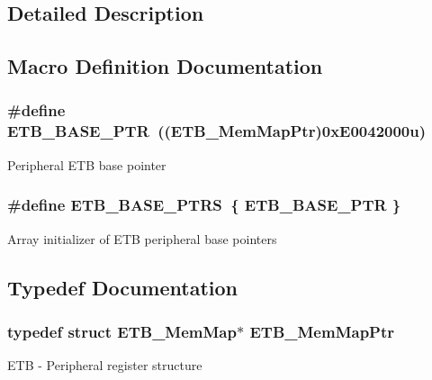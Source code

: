 \subsection{Detailed Description}


\subsection{Macro Definition Documentation}
\hypertarget{group___e_t_b___peripheral_gaaefe9b614cb5542a69cb7461307f1267}{}
\subsubsection[{E\+T\+B\+\_\+\+B\+A\+S\+E\+\_\+\+P\+T\+R}]{\setlength{\rightskip}{0pt plus 5cm}\#define E\+T\+B\+\_\+\+B\+A\+S\+E\+\_\+\+P\+T\+R~(({\bf E\+T\+B\+\_\+\+Mem\+Map\+Ptr})0x\+E0042000u)}\label{group___e_t_b___peripheral_gaaefe9b614cb5542a69cb7461307f1267}
Peripheral E\+T\+B base pointer \hypertarget{group___e_t_b___peripheral_gac711afdddacdf91115488b20e07ded2f}{}
\subsubsection[{E\+T\+B\+\_\+\+B\+A\+S\+E\+\_\+\+P\+T\+R\+S}]{\setlength{\rightskip}{0pt plus 5cm}\#define E\+T\+B\+\_\+\+B\+A\+S\+E\+\_\+\+P\+T\+R\+S~\{ {\bf E\+T\+B\+\_\+\+B\+A\+S\+E\+\_\+\+P\+T\+R} \}}\label{group___e_t_b___peripheral_gac711afdddacdf91115488b20e07ded2f}
Array initializer of E\+T\+B peripheral base pointers 

\subsection{Typedef Documentation}
\hypertarget{group___e_t_b___peripheral_ga8b44c770780865d622e8799d88981d9e}{}
\subsubsection[{E\+T\+B\+\_\+\+Mem\+Map\+Ptr}]{\setlength{\rightskip}{0pt plus 5cm}typedef struct {\bf E\+T\+B\+\_\+\+Mem\+Map}$\ast$ {\bf E\+T\+B\+\_\+\+Mem\+Map\+Ptr}}\label{group___e_t_b___peripheral_ga8b44c770780865d622e8799d88981d9e}
E\+T\+B -\/ Peripheral register structure 